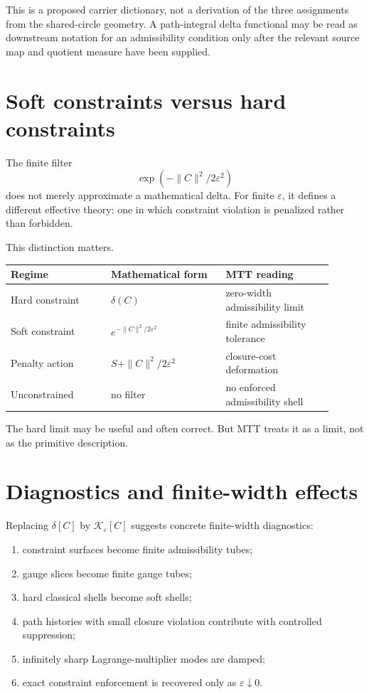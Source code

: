 \documentclass[11pt]{article}
\begin{document}
This is a proposed carrier dictionary, not a derivation of the three assignments from the
shared-circle geometry. A path-integral delta functional may be read as downstream notation
for an admissibility condition only after the relevant source map and quotient measure have
been supplied.

\section{Soft constraints versus hard constraints}

The finite filter
\[
\exp(-\|C\|^2/2\varepsilon^2)
\]
does not merely approximate a mathematical delta.  For finite \(\varepsilon\), it defines a different
effective theory: one in which constraint violation is penalized rather than forbidden.

This distinction matters.

\begin{center}
\begin{tabular}{>{\raggedright\arraybackslash}p{0.28\linewidth}>{\raggedright\arraybackslash}p{0.32\linewidth}>{\raggedright\arraybackslash}p{0.30\linewidth}}
\toprule
Regime & Mathematical form & MTT reading \\
\midrule
Hard constraint & \(\delta(C)\) & zero-width admissibility limit \\
Soft constraint & \(e^{-\|C\|^2/2\varepsilon^2}\) & finite admissibility tolerance \\
Penalty action & \(S+\|C\|^2/2\varepsilon^2\) & closure-cost deformation \\
Unconstrained & no filter & no enforced admissibility shell \\
\bottomrule
\end{tabular}
\end{center}

The hard limit may be useful and often correct.  But MTT treats it as a limit, not as the
primitive description.

\section{Diagnostics and finite-width effects}

Replacing \(\delta[C]\) by \(\mathcal K_\varepsilon[C]\) suggests concrete finite-width diagnostics:

\begin{enumerate}
\item constraint surfaces become finite admissibility tubes;
\item gauge slices become finite gauge tubes;
\item hard classical shells become soft shells;
\item path histories with small closure violation contribute with controlled suppression;
\item infinitely sharp Lagrange-multiplier modes are damped;
\item exact constraint enforcement is recovered only as \(\varepsilon\downarrow0\).
\end{enumerate}
\end{document}
